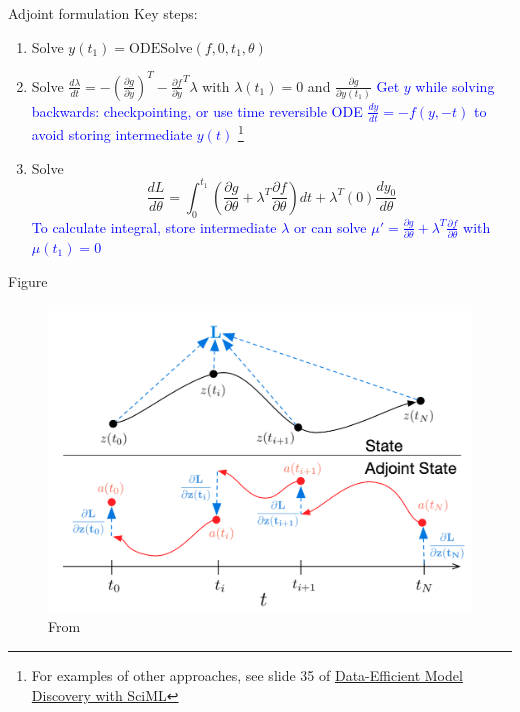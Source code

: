 \documentclass[usenames,dvipsnames]{beamer}
\theoremstyle{definition}
\let\oldcite=\cite
\renewcommand{\cite}[2][]{\textcolor{green}{\oldcite[#1]{#2}}}
\begin{document}
\begin{frame}{Adjoint formulation}
Key steps:

\begin{enumerate}
    \item Solve $y(t_1) = \textrm{ODESolve}(f, 0, t_1, \theta)$
    
    \item Solve $\frac{d\lambda}{dt} = -\left(\frac{\partial g}{\partial y}\right)^T - \frac{\partial f}{\partial y}^T \lambda$ with $\lambda(t_1)=0$ and $\frac{\partial g}{\partial y(t_1)}$ \textcolor{blue}{Get $y$ while solving backwards: checkpointing, or use time reversible ODE $\frac{dy}{dt} = -f(y, -t)$ to avoid storing intermediate $y(t)$ 
    \footnote{For examples of other approaches, see slide 35 of \href{https://elliit.se/wp-content/uploads/2022/06/ELLIIT_FP2022_Lund_Chris_Rackauckas.pdf}{Data-Efficient Model Discovery with SciML}}
    }
    
    \item Solve $$\frac{dL}{d\theta} = \int_{0}^{t_1} \left(\frac{\partial g}{\partial \theta} + \lambda^T \frac{\partial f}{\partial \theta}\right)dt + \lambda^T(0) \frac{dy_0}{d\theta}$$ \textcolor{blue}{To calculate integral, store intermediate $\lambda$ or can solve $\mu' = \frac{\partial g}{\partial \theta} + \lambda^T \frac{\partial f}{\partial \theta}$ with $\mu(t_1)=0$}
\end{enumerate}

\end{frame}






\begin{frame}{Figure}
    \begin{figure}
        \centering
        \includegraphics[width=0.75\linewidth]{adjoint_state.png}
        \caption{From \cite{chen2019neural}}
        \label{fig:adj_soln}
    \end{figure}

\end{frame}
\end{document}
